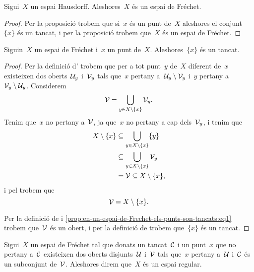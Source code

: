 \documentclass[../topologia.tex]{subfiles}
\begin{document}
    \begin{corollary}
        \label{cor:els-espais-Hausdorff-son-Frechet}
        Sigui~\(X\) un espai Hausdorff.
        Aleshores~\(X\) és un espai de Fréchet.
    \end{corollary}
    \begin{proof}
        Per la proposició  trobem que si~\(x\) és un punt de~\(X\) aleshores el conjunt~\(\{x\}\) és un tancat, i per la proposició  trobem que~\(X\) és un espai de Fréchet.
    \end{proof}
    \begin{proposition}
        \label{prop:en-un-espai-de-Frechet-els-punts-son-tancats}
        Siguin~\(X\) un espai de Fréchet i~\(x\) un punt de~\(X\).
        Aleshores~\(\{x\}\) és un tancat.
    \end{proposition}
    \begin{proof}
        Per la definició d' trobem que per a tot punt~\(y\) de~\(X\) diferent de~\(x\) existeixen dos oberts~\(\mathcal{U}_{y}\) i~\(\mathcal{V}_{y}\) tals que~\(x\) pertany a~\(\mathcal{U}_{y}\setminus\mathcal{V}_{y}\) i~\(y\) pertany a~\(\mathcal{V}_{y}\setminus\mathcal{U}_{y}\).
        Considerem
        \begin{equation}
            \label{prop:en-un-espai-de-Frechet-els-punts-son-tancats:eq1}
            \mathcal{V}=\bigcup_{y\in X\setminus\{x\}}\mathcal{V}_{y}.
        \end{equation}
        Tenim que~\(x\) no pertany a~\(\mathcal{V}\), ja que~\(x\) no pertany a cap dels~\(\mathcal{V}_{y}\), i tenim que
        \begin{align*}
            X\setminus\{x\}&\subseteq\bigcup_{y\in X\setminus\{x\}}\{y\} \\
            &\subseteq\bigcup_{y\in X\setminus\{x\}}\mathcal{V}_{y}\\
            &=\mathcal{V}\subseteq X\setminus\{x\},
        \end{align*}
        i pel  trobem que
        \[
            \mathcal{V}=X\setminus\{x\}.
        \]

        Per la definició de  i \eqref{prop:en-un-espai-de-Frechet-els-punts-son-tancats:eq1} trobem que~\(\mathcal{V}\) és un obert, i per la definició de   trobem que~\(\{x\}\) és un tancat.
    \end{proof}
    \begin{definition}
        \label{def:espai-regular}
        Sigui~\(X\) un espai de Fréchet tal que donats un tancat~\(\mathcal{C}\) i un punt~\(x\) que no pertany a~\(\mathcal{C}\) existeixen dos oberts disjunts~\(\mathcal{U}\) i~\(\mathcal{V}\) tals que~\(x\) pertany a~\(\mathcal{U}\) i~\(\mathcal{C}\) és un subconjunt de~\(\mathcal{V}\).
        Aleshores direm que~\(X\) és un espai regular.
    \end{definition}
\end{document}
